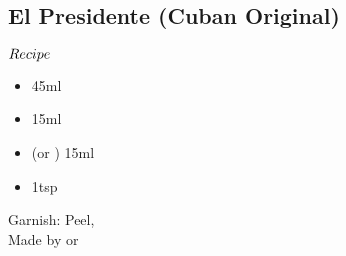 \subsection{El Presidente (Cuban Original)}
\begin{itembox}[l]{\boldmath $Recipe$}
\begin{itemize}
\setlength{\parskip}{0cm}
\setlength{\itemsep}{0cm}
\item \lrum 45ml
\item \vermouth 15ml
\item \oc (or \wc) 15ml
\item \gs 1tsp
\end{itemize}
\vspace{-4mm}
Garnish: \orange Peel, \cherry\\
Made by \shake or \stir
\end{itembox}
